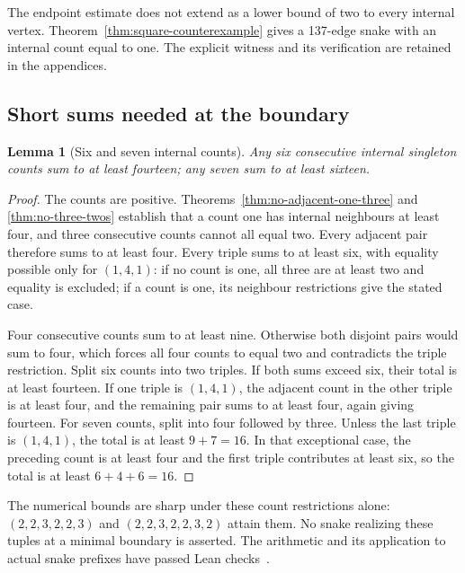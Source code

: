 \documentclass[11pt,a4paper]{article}
\newtheorem{lemma}[theorem]{Lemma}
\theoremstyle{definition}
\theoremstyle{remark}
\begin{document}
The endpoint estimate does not extend as a lower bound of two to every internal vertex. Theorem~\ref{thm:square-counterexample} gives a 137-edge snake with an internal count equal to one. The explicit witness and its verification are retained in the appendices.

\subsection{Short sums needed at the boundary}
\begin{lemma}[Six and seven internal counts]\label{lem:boundary-short-sums}
Any six consecutive internal singleton counts sum to at least fourteen;
any seven sum to at least sixteen.
\end{lemma}
\begin{proof}
The counts are positive. Theorems~\ref{thm:no-adjacent-one-three} and
\ref{thm:no-three-twos} establish that a count one has internal neighbours
at least four, and three consecutive counts cannot all equal two.
Every adjacent pair therefore sums to at least four. Every triple sums
to at least six, with equality possible only for $(1,4,1)$: if no count
is one, all three are at least two and equality is excluded; if a count
is one, its neighbour restrictions give the stated case.

Four consecutive counts sum to at least nine. Otherwise both disjoint
pairs would sum to four, which forces all four counts to equal two and
contradicts the triple restriction. Split six counts into two triples.
If both sums exceed six, their total is at least fourteen. If one triple
is $(1,4,1)$, the adjacent count in the other triple is at least four,
and the remaining pair sums to at least four, again giving fourteen.
For seven counts, split into four followed by three. Unless the last
triple is $(1,4,1)$, the total is at least $9+7=16$. In that exceptional
case, the preceding count is at least four and the first triple contributes
at least six, so the total is at least $6+4+6=16$.
\end{proof}
The numerical bounds are sharp under these count restrictions alone:
$(2,2,3,2,2,3)$ and $(2,2,3,2,2,3,2)$ attain them. No snake realizing
these tuples at a minimal boundary is asserted. The arithmetic and its
application to actual snake prefixes have passed Lean checks~\cite{boundary175archive}.
\end{document}
